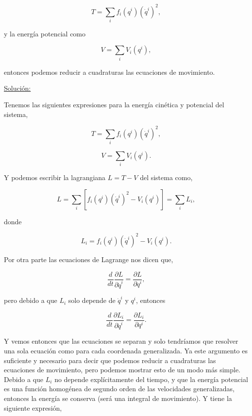 \documentclass[a4paper,10pt]{article}
\numberwithin{equation}{section}
\begin{document}
$$
T = \sum_i f_i(q^i)(\dot{q}^i)^2,
$$

y la energía potencial como

$$
V = \sum_i V_i(q^i),
$$

entonces podemos reducir a cuadraturas las ecuaciones de movimiento.

\vspace{.3cm}

\underline{Solución:} \vspace{.3cm}

Tenemos las siguientes expresiones para la energía cinética y potencial del sistema,

\begin{equation}
 T = \sum_i f_i(q^i)(\dot{q}^i)^2,
 \label{eq:2cinetica1}
\end{equation}

\begin{equation}
 V = \sum_i V_i(q^i).
 \label{eq:2potencial1}
\end{equation}

Y podemos escribir la lagrangiana $L = T - V$ del sistema como,

\begin{equation}
 L = \sum_i \left[ f_i(q^i)(\dot{q}^i)^2 - V_i(q^i)\right] = \sum_i L_i,
\end{equation}

donde

\begin{equation}
 L_i = f_i(q^i)(\dot{q}^i)^2 - V_i(q^i).
\end{equation}

Por otra parte las ecuaciones de Lagrange nos dicen que,

\begin{equation}
 \frac{d}{dt} \frac{\partial L}{\partial \dot{q}^i} = \frac{\partial L}{\partial q^i},
\end{equation}

pero debido a que $L_i$ solo depende de $\dot{q}^i$ y $q^i$, entonces

\begin{equation}
 \frac{d}{dt} \frac{\partial L_i}{\partial \dot{q}^i} = \frac{\partial L_i}{\partial q^i}. 
 \label{eq:3ecdeLagrange1}
\end{equation}

Y vemos entonces que las ecuaciones se separan y solo tendríamos que resolver una sola ecuación
como  para cada coordenada generalizada. Ya este argumento es 
suficiente y necesario para decir que podemos reducir a cuadraturas las ecuaciones de 
movimiento, pero podemos mostrar esto de un modo más simple. Debido a que $L_i$ no 
depende explícitamente del tiempo, y que la energía potencial es una función homogénea 
de segundo orden de las velocidades generalizadas, entonces la energía se conserva (será
una integral de movimiento). Y tiene la siguiente expresión,
\end{document}
